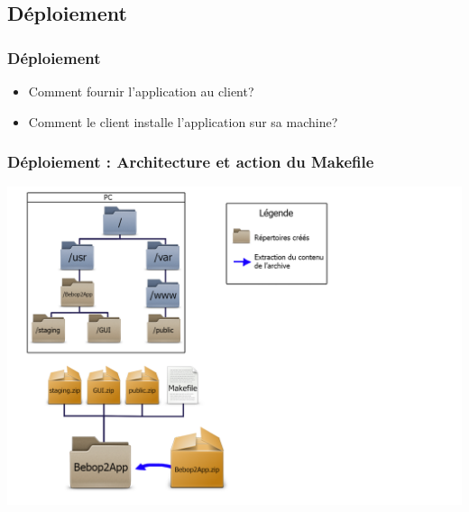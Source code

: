 \documentclass{beamer}
\begin{document}
	
	
	\begin{frame}
	\section{Déploiement}
		\begin{center}
		\frametitle{Déploiement}
		\begin{itemize}
	    \item	Comment fournir l'application au client?\\
	    \item	Comment le client installe l'application sur sa machine?
		\end{itemize}
		\end{center}
	\end{frame}
	
	
	\begin{frame}
		\begin{center}
		\frametitle{Déploiement : Architecture et action du Makefile}
        \includegraphics[scale=0.24]{schema_deploiement_01.png}
		\end{center}
	\end{frame}
	
	
\end{document}
